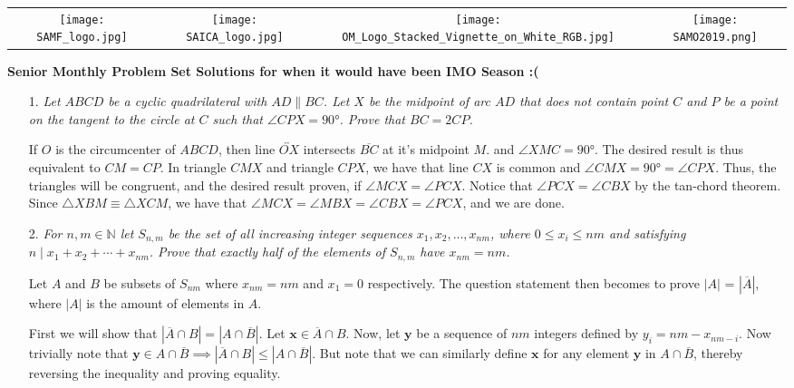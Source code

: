 \documentclass{article}
\begin{document}
\setlength{\tabcolsep}{6pt}
\begin{center} \begin{tabular}{cccc}
	\texttt{[image: SAMF\_logo.jpg]} &
	\texttt{[image: SAICA\_logo.jpg]} &
	\texttt{[image: OM\_Logo\_Stacked\_Vignette\_on\_White\_RGB.jpg]} &
	\texttt{[image: SAMO2019.png]}
\end{tabular} \end{center}


\bigskip


\begin{center}
	\textbf{\Large Senior Monthly Problem Set Solutions for when it would have been IMO Season :(}
\end{center}

\begin{enumerate}

\medskip
\item[1.] %
\textit{Let $ABCD$ be a cyclic quadrilateral with $AD \parallel BC$. Let $X$ be the midpoint of arc $AD$ that does not contain point $C$ and $P$ be a point on the tangent to the circle at $C$ such that $\angle CPX = 90 \si{\degree} $. Prove that $BC = 2 CP$.}

If $O$ is the circumcenter of $ABCD$, then line $\overleftrightarrow{OX}$ intersects $\overline{BC}$ at it's midpoint $M$. and $\angle XMC = 90 \si{\degree}$. The desired result is thus equivalent to $CM = CP$. In triangle $CMX$ and triangle $CPX$, we have that line $CX$ is common and $\angle CMX = 90 \si{\degree} = \angle CPX$. Thus, the triangles will be congruent, and the desired result proven, if $\angle MCX = \angle PCX$. Notice that $\angle PCX = \angle CBX$ by the tan-chord theorem. Since $\triangle XBM \equiv \triangle XCM$, we have that $\angle MCX = \angle MBX = \angle CBX = \angle PCX$, and we are done.


\medskip
\item[2.] %
\textit{For $n,m\in\mathbb{N}$ let $S_{n,m}$ be the set of all increasing integer sequences $x_{1},x_{2},\ldots,x_{nm}$, where $0\leq x_i\leq nm$ and satisfying $n \mid x_{1} + x_{2} + \cdots +x_{nm}$. Prove that exactly half of the elements of $S_{n,m}$ have $x_{nm}=nm$.}

Let $A$ and $B$ be subsets of $S_{nm}$ where $x_{nm} = nm$ and $x_1 = 0$ respectively. The question statement then becomes to prove $|A|$ = $|\overline{A}|$, where $|A|$ is the amount of elements in $A$.

First we will show that $|\overline{A}\cap B| = |A\cap\overline{B}|$. 
Let $\mathbf{x} \in \overline{A}\cap B$. Now, let $\mathbf{y}$ be a sequence of $nm$ integers defined by $y_i = nm - x_{nm-i}$. Now trivially note that $\mathbf{y} \in A\cap\overline{B} \implies |\overline{A}\cap B| \leq |A\cap\overline{B}|$. But note that we can similarly define $\mathbf{x}$ for any element $\mathbf{y}$ in $A\cap\overline{B}$, thereby reversing the inequality and proving equality. 


\end{enumerate}
\end{document}
